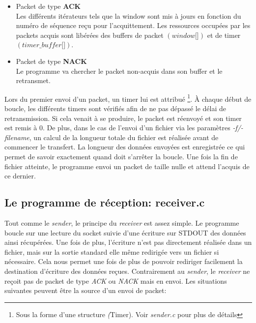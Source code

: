 \documentclass[11pt,a4paper]{article}
\begin{document}
\vspace{3mm}

\begin{itemize}
\item{Packet de type \textbf{ACK} \\ Les différents itérateurs tels que la window sont mis à jours en fonction du numéro de séquence reçu pour l'acquittement. Les ressources occupées par les packets acquis sont libérées des buffers de packet $\left( \textit{window[]} \right)$ et de timer $\left(\textit{timer\_buffer[]} \right)$.}
\item{Packet de type \textbf{NACK} \\ Le programme va chercher le packet non-acquis dans son buffer et le retransmet.}
\end{itemize}

\vspace{3mm}

Lors du premier envoi d'un packet, un timer lui est attribué \footnote{Sous la forme d'une structure \textit(Timer). Voir \textit{sender.c} pour plus de détails}. À chaque début de boucle, les différents timers sont vérifiés afin de ne pas dépassé le délai de retransmission. Si cela venait à se produire, le packet est réenvoyé et son timer est remis à 0. De plus, dans le cas de l'envoi d'un fichier via les paramètres \textit{-f/-filename}, un calcul de la longueur totale du fichier est réalisée avant de commencer le transfert. La longueur des données envoyées est enregistrée ce qui permet de savoir exactement quand doit s'arrêter la boucle. Une fois la fin de fichier atteinte, le programme envoi un packet de taille nulle et attend l'acquis de ce dernier.

\subsection{Le programme de réception: receiver.c}
Tout comme le \textit{sender}, le principe du \textit{receiver} est assez simple. Le programme boucle sur une lecture du socket suivie d'une écriture sur STDOUT des données ainsi récupérées. Une fois de plus, l'écriture n'est pas directement réalisée dans un fichier, mais sur la sortie standard elle même redirigée vers un fichier si nécessaire. Cela nous permet une fois de plus de pouvoir rediriger facilement la destination d'écriture des données reçues. Contrairement au \textit{sender}, le \textit{receiver} ne reçoit pas de packet de type \textit{ACK} ou \textit{NACK} mais en envoi. Les situations suivantes peuvent être la source d'un envoi de packet:
\end{document}
